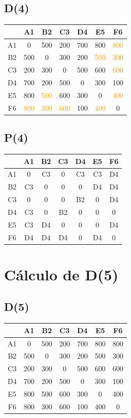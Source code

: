 \documentclass[a4paper,11pt]{article}
\begin{document}
\subsection*{D(4)}
\begin{center}
\begin{tabular}{c|cccccc}
 & A1 & B2 & C3 & D4 & E5 & F6 \\ \hline
A1 & 0 & 500 & 200 & 700 & 800 & \textcolor{orange}{800} \\
B2 & 500 & 0 & 300 & 200 & \textcolor{orange}{500} & \textcolor{orange}{300} \\
C3 & 200 & 300 & 0 & 500 & 600 & \textcolor{orange}{600} \\
D4 & 700 & 200 & 500 & 0 & 300 & 100 \\
E5 & 800 & \textcolor{orange}{500} & 600 & 300 & 0 & \textcolor{orange}{400} \\
F6 & \textcolor{orange}{800} & \textcolor{orange}{300} & \textcolor{orange}{600} & 100 & \textcolor{orange}{400} & 0 \\
\end{tabular}
\end{center}
\subsection*{P(4)}
\begin{center}
\begin{tabular}{c|cccccc}
 & A1 & B2 & C3 & D4 & E5 & F6 \\ \hline
A1 & 0 & C3 & 0 & C3 & C3 & D4 \\
B2 & C3 & 0 & 0 & 0 & D4 & D4 \\
C3 & 0 & 0 & 0 & B2 & 0 & D4 \\
D4 & C3 & 0 & B2 & 0 & 0 & 0 \\
E5 & C3 & D4 & 0 & 0 & 0 & D4 \\
F6 & D4 & D4 & D4 & 0 & D4 & 0 \\
\end{tabular}
\end{center}
\newpage
\section*{Cálculo de D(5)}
\subsection*{D(5)}
\begin{center}
\begin{tabular}{c|cccccc}
 & A1 & B2 & C3 & D4 & E5 & F6 \\ \hline
A1 & 0 & 500 & 200 & 700 & 800 & 800 \\
B2 & 500 & 0 & 300 & 200 & 500 & 300 \\
C3 & 200 & 300 & 0 & 500 & 600 & 600 \\
D4 & 700 & 200 & 500 & 0 & 300 & 100 \\
E5 & 800 & 500 & 600 & 300 & 0 & 400 \\
F6 & 800 & 300 & 600 & 100 & 400 & 0 \\
\end{tabular}
\end{center}
\end{document}
